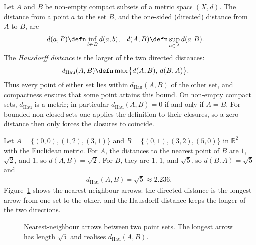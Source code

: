 \documentclass[a4paper, 12pt]{book}
\begin{document}
\begin{definition}
    Let $A$ and $B$ be non-empty compact subsets of a metric space $(X,d)$. The distance from a point $a$ to the set $B$, and the one-sided (directed) distance from $A$ to $B$, are
    \begin{align}
        d(a,B) &\defn \inf_{b\in B} d(a,b), &
        d(A,B) &\defn \sup_{a\in A} d(a,B).
    \end{align}
    The \emph{Hausdorff distance} is the larger of the two directed distances:
    \begin{align}
        d_{\mathrm{Hau}}(A,B) &\defn \max\big\{d(A,B),\,d(B,A)\big\}.
    \end{align}
    Thus every point of either set lies within $d_{\mathrm{Hau}}(A,B)$ of the other set, and compactness ensures that some point attains this bound. On non-empty compact sets, $d_{\mathrm{Hau}}$ is a metric; in particular $d_{\mathrm{Hau}}(A,B)=0$ if and only if $A=B$. For bounded non-closed sets one applies the definition to their closures, so a zero distance then only forces the closures to coincide.
\end{definition}

\begin{example}
    Let $A=\{(0,0),(1,2),(3,1)\}$ and $B=\{(0,1),(3,2),(5,0)\}$ in $\mathbb{R}^2$ with the Euclidean metric. For $A$, the distances to the nearest point of $B$ are $1$, $\sqrt{2}$, and $1$, so $d(A,B)=\sqrt{2}$. For $B$, they are $1$, $1$, and $\sqrt{5}$, so $d(B,A)=\sqrt{5}$ and
    \begin{align}
        d_{\mathrm{Hau}}(A,B)=\sqrt{5}\approx 2.236.
    \end{align}
    Figure~\ref{fig:hausdorff-points} shows the nearest-neighbour arrows: the directed distance is the longest arrow from one set to the other, and the Hausdorff distance keeps the longer of the two directions.
\end{example}

\begin{figure}[htbp]
\centering
{}
\caption{Nearest-neighbour arrows between two point sets. The longest arrow has length $\sqrt{5}$ and realises $d_{\mathrm{Hau}}(A,B)$.}
\label{fig:hausdorff-points}
\end{figure}
\end{document}
